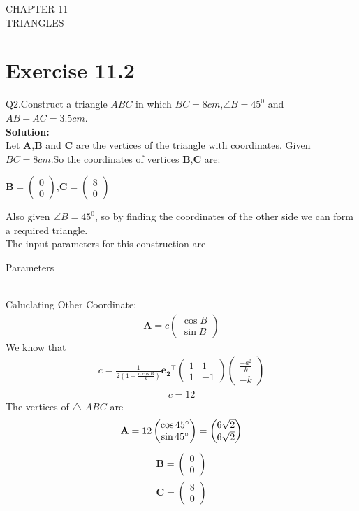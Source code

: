 \documentclass{article}
\newcommand{\myvec}[1]{\ensuremath{\begin{pmatrix}#1\end{pmatrix}}}
\let\vec\mathbf
\begin{document}
\begin{center}
        \textbf\large{CHAPTER-11 \\ TRIANGLES}
\end{center}
\section{Exercise 11.2}
Q2.Construct a triangle $ABC$ in which $BC=8cm$,$\angle{B}=45^0$ and $AB-AC=3.5cm$. \\
\textbf{Solution:}\\
\fi
Let $\vec{A}$,$\vec{B}$ and $\vec{C}$ are the vertices of the triangle with coordinates.
Given $BC=8cm$.So the coordinates of vertices $\vec{B}$,$\vec{C}$ are:
\begin{center}
{
$\vec{B} =\myvec{0\\0}$,$\vec{C} =\myvec{8\\0}$
}
\end{center}
Also given $\angle{B}=45^0$, so by finding the coordinates of the other side we can form a required triangle. \\
 The input parameters for this construction are
 \begin{table}[h]
	  \centering
	  
	  \caption{Parameters}
	  \label{tab:chapters/9/11/2/2-new/tables/table1}	  
\end{table}\\
Caluclating Other Coordinate:
  \begin{align}
	  \vec{A} = c\myvec{\cos{B}\\\sin{B}}
	  \end{align}
We know that\\
\begin{align}  
      c = \frac{1}{2(1-\frac{a\cos{B}}{k})}\vec{e_2}^{\top}\myvec{1 & 1\\1 & -1}\myvec{\frac{-a^2}{k}\\-k}
     \end{align}
  \begin{align}
	 c = 12
      \end{align}		
The vertices of $\triangle$ $ABC$ are \\
\begin{align}
\vec{A} = 12\myvec{\cos 45\degree\\\sin 45\degree}
	 = \myvec{6\sqrt{2}\\6\sqrt{2}}
\end{align}
\begin{align}
 \vec{B} = \myvec{0\\0}\\
 \vec{C} = \myvec{8\\0}
 \end{align} 	      
\end{document}
